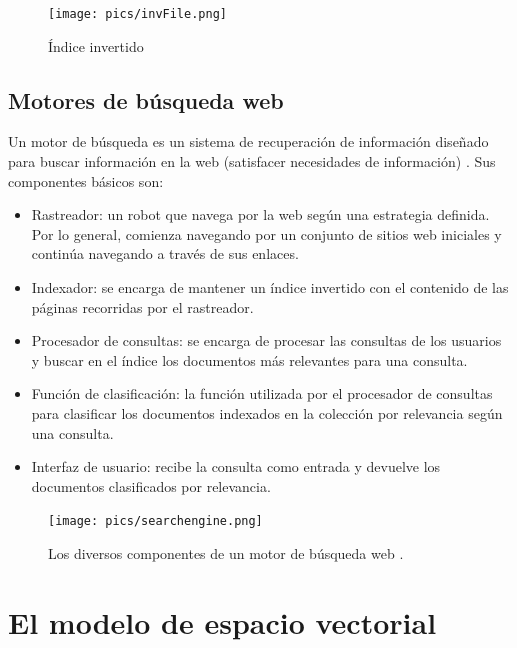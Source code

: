 \documentclass{book}
\begin{document}
\begin{figure}[h!]
\centering
\texttt{[image: pics/invFile.png]}
\caption{Índice invertido}
\end{figure}

\subsection{Motores de búsqueda web}

Un motor de búsqueda es un sistema de recuperación de información diseñado para buscar información en la web (satisfacer necesidades de información) \cite{manning2008}. Sus componentes básicos son:

\begin{itemize}
\item Rastreador: un robot que navega por la web según una estrategia definida. Por lo general, comienza navegando por un conjunto de sitios web iniciales y continúa navegando a través de sus enlaces.
\item Indexador: se encarga de mantener un índice invertido con el contenido de las páginas recorridas por el rastreador.
\item Procesador de consultas: se encarga de procesar las consultas de los usuarios y buscar en el índice los documentos más relevantes para una consulta.
\item Función de clasificación: la función utilizada por el procesador de consultas para clasificar los documentos indexados en la colección por relevancia según una consulta.
\item Interfaz de usuario: recibe la consulta como entrada y devuelve los documentos clasificados por relevancia.
\end{itemize}

\begin{figure}[h!]
\centering
\texttt{[image: pics/searchengine.png]}
\caption{Los diversos componentes de un motor de búsqueda web \cite{manning2008}.}
\end{figure}
\section{El modelo de espacio vectorial}
\end{document}
